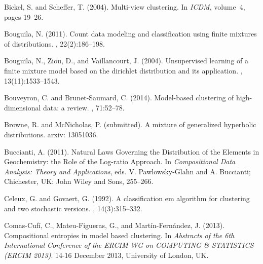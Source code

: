\documentclass[preprint, review, 3p, authoryear]{elsarticle}
\begin{document}
\begin{thebibliography}{00}
Bickel, S. and Scheffer, T. (2004).
\newblock Multi-view clustering.
\newblock In {\em ICDM}, volume~4, pages 19--26.


Bouguila, N. (2011).
\newblock Count data modeling and classification using finite mixtures of
  distributions.
, 22(2):186--198.

Bouguila, N., Ziou, D., and Vaillancourt, J. (2004).
\newblock Unsupervised learning of a finite mixture model based on the
  dirichlet distribution and its application.
, 13(11):1533--1543.

Bouveyron, C. and Brunet-Saumard, C. (2014).
\newblock Model-based clustering of high-dimensional data: a review.
, 71:52--78.

Browne, R. and McNicholas, P. (submitted).
\newblock A mixture of generalized hyperbolic distributions. arxiv: 13051036.

Buccianti, A. (2011). 
\newblock Natural Laws Governing the Distribution of the Elements in Geochemistry: the Role of the Log-ratio Approach.
\newblock In {\em Compositional Data Analysis: Theory
and Applications}, eds. V. Pawlowsky-Glahn and A. Buccianti; Chichester, UK: John Wiley and Sons, 255--266.

Celeux, G. and Govaert, G. (1992).
\newblock A classification em algorithm for clustering and two stochastic
  versions.
, 14(3):315--332.

Comas-Cuf\'i, C., Mateu-Figueras, G., and Mart\'in-Fern\'andez, J. (2013).
\newblock Compositional entropies in model based clustering.
\newblock In {\em Abstracts of the 6th International Conference of the ERCIM WG
  on COMPUTING \& STATISTICS (ERCIM 2013)}. 14-16 December 2013, University of
  London, UK.


\end{thebibliography}
\end{document}
